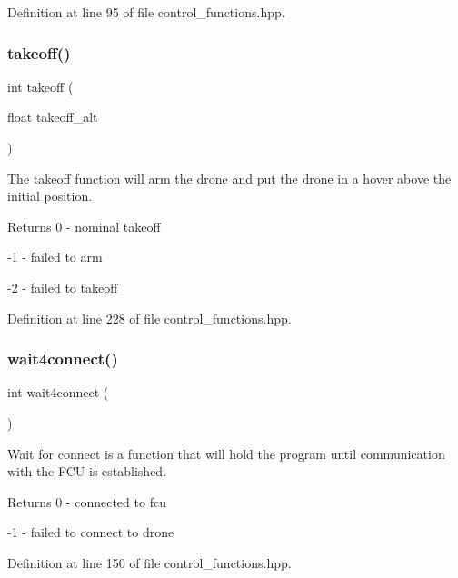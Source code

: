Definition at line 95 of file control\+\_\+functions.\+hpp.

\mbox{\label{group__control__functions_gac0aa671c99c09687515ec5bb8891c7d2}} 
\subsubsection{\texorpdfstring{takeoff()}{takeoff()}}
{\footnotesize\ttfamily int takeoff (\begin{DoxyParamCaption}\item[{float}]{takeoff\+\_\+alt }\end{DoxyParamCaption})}

The takeoff function will arm the drone and put the drone in a hover above the initial position. \begin{DoxyReturn}{Returns}
0 -\/ nominal takeoff 

-\/1 -\/ failed to arm 

-\/2 -\/ failed to takeoff 
\end{DoxyReturn}


Definition at line 228 of file control\+\_\+functions.\+hpp.

\mbox{\label{group__control__functions_ga1921a30d419eb397f7e40875217b45d1}} 
\subsubsection{\texorpdfstring{wait4connect()}{wait4connect()}}
{\footnotesize\ttfamily int wait4connect (\begin{DoxyParamCaption}{ }\end{DoxyParamCaption})}

Wait for connect is a function that will hold the program until communication with the F\+CU is established. \begin{DoxyReturn}{Returns}
0 -\/ connected to fcu 

-\/1 -\/ failed to connect to drone 
\end{DoxyReturn}


Definition at line 150 of file control\+\_\+functions.\+hpp.

